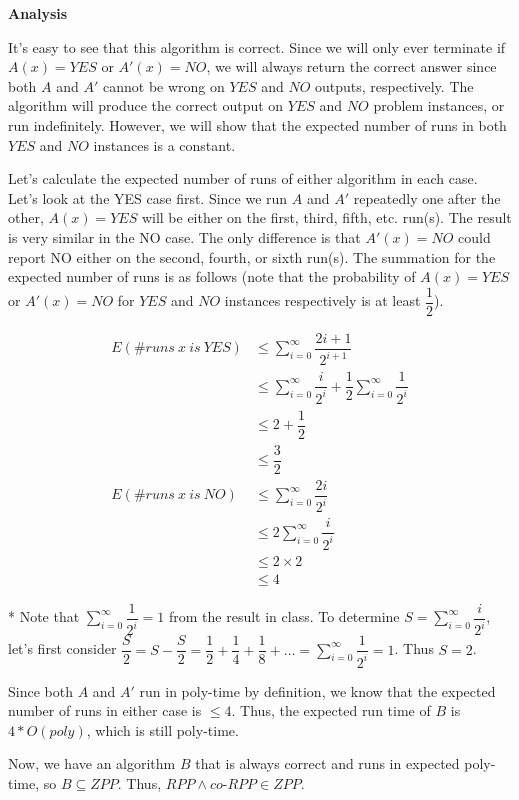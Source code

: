 \documentclass{article}
\begin{document}
\textbf{Analysis}

It's easy to see that this algorithm is correct. Since we will only ever terminate if $A(x) = YES$ or $A'(x) = NO$, we
will always return the correct answer since both $A$ and $A'$ cannot be wrong on $YES$ and $NO$ outputs,
respectively. The algorithm will produce the correct output on $YES$ and $NO$ problem instances, or run indefinitely.
However, we will show that the expected number of runs in both $YES$ and $NO$ instances is a constant.

Let's calculate the expected number of runs of either algorithm in each case. Let's look at the YES case first. Since we
run $A$ and $A'$ repeatedly one after the other, $A(x) = YES$ will be either on the first, third, fifth, etc. run(s).
The result is very similar in the NO case.  The only difference is that $A'(x) = NO$ could report NO either on the
second, fourth, or sixth run(s).  The summation for the expected number of runs is as follows (note that the probability
of $A(x) = YES$ or $A'(x) = NO$ for $YES$ and $NO$ instances respectively is at least $\dfrac{1}{2}$).


\begin{align*}
    E(\# runs \: x \: is \: YES) &\leq \sum_{i=0}^{\infty} \dfrac{2i + 1}{2^{i+1}} \\
                      &\leq \sum_{i=0}^{\infty} \dfrac{i}{2^{i}} + \dfrac{1}{2} \sum_{i=0}^{\infty} \dfrac{1}{2^{i}} \\
                      &\leq 2 + \dfrac{1}{2} \\
                      &\leq \dfrac{3}{2} \\
    E(\# runs \: x \: is \: NO)  &\leq \sum_{i=0}^{\infty} \dfrac{2i}{2^{i}} \\
                      &\leq 2 \sum_{i=0}^{\infty} \dfrac{i}{2^{i}} \\
                      &\leq 2 \times 2 \\
                      &\leq 4
\end{align*}

* Note that $\sum_{i=0}^{\infty} \dfrac{1}{2^i} = 1$ from the result in class. To determine $S = \sum_{i=0}^{\infty}
\dfrac{i}{2^i}$, let's first consider $\dfrac{S}{2} = S - \dfrac{S}{2} = \dfrac{1}{2} + \dfrac{1}{4} + \dfrac{1}{8} +
\ldots = \sum_{i=0}^{\infty} \dfrac{1}{2^i} = 1$. Thus $S = 2$.

Since both $A$ and $A'$ run in poly-time by definition, we know that the expected number of runs in either case is $\leq
4$. Thus, the expected run time of $B$ is $4 * O(poly)$, which is still poly-time.

Now, we have an algorithm $B$ that is always correct and runs in expected poly-time, so $B \subseteq ZPP$. Thus, $RPP
\land co$-$RPP \in ZPP$.
\end{document}
